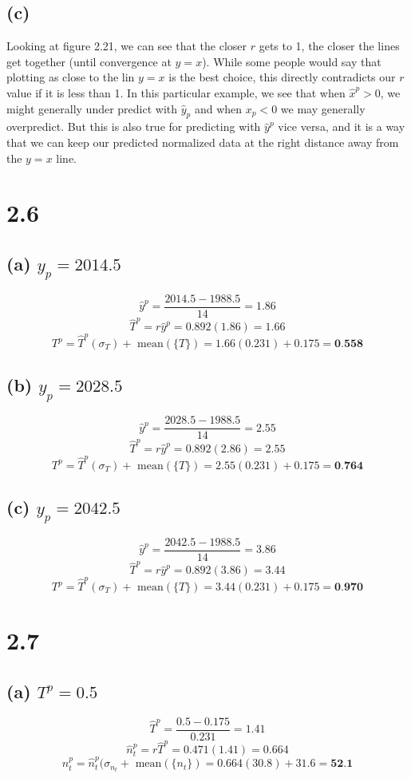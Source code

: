 \documentclass[11pt]{article}
\begin{document}
\subsection*{(c)}
Looking at figure 2.21, we can see that the closer $r$ gets to 1, the closer the lines get together (until convergence at $y=x$). While some people would say that plotting as close to the lin $y=x$ is the best choice, this directly contradicts our $r$ value if it is less than 1. In this particular example, we see that when $\hat{x}^p>0$, we might generally under predict with $\hat{y}_p$ and when $x_p<0$ we may generally overpredict. But this is also true for predicting with $\hat{y}^p$ vice versa, and it is a way that we can keep our predicted normalized data at the right distance away from the $y=x$ line.
\clearpage
\section*{2.6}
\subsection*{(a) $y_p=2014.5$}
\[\hat{y}^p=\frac{2014.5-1988.5}{14}=1.86\]
\[\hat{T}^p=r\hat{y}^p=0.892(1.86)=1.66\]
\[T^p=\hat{T}^p(\sigma_T)+\text{ mean}(\{T\})=1.66(0.231)+0.175=\textbf{0.558}\]
\subsection*{(b) $y_p=2028.5$}
\[\hat{y}^p=\frac{2028.5-1988.5}{14}=2.55\]
\[\hat{T}^p=r\hat{y}^p=0.892(2.86)=2.55\]
\[T^p=\hat{T}^p(\sigma_T)+\text{ mean}(\{T\})=2.55(0.231)+0.175=\textbf{0.764}\]
\subsection*{(c) $y_p=2042.5$}
\[\hat{y}^p=\frac{2042.5-1988.5}{14}=3.86\]
\[\hat{T}^p=r\hat{y}^p=0.892(3.86)=3.44\]
\[T^p=\hat{T}^p(\sigma_T)+\text{ mean}(\{T\})=3.44(0.231)+0.175=\textbf{0.970}\]
\clearpage
\section*{2.7}
\subsection*{(a) $T^p=0.5$}
\[\hat{T}^p=\frac{0.5-0.175}{0.231}=1.41\]
\[\hat{n}_t^p=r\hat{T}^p=0.471(1.41)=0.664\]
\[n_t^p=\hat{n}_t^p(\sigma_{n_t}+\text{ mean}(\{n_t\})=0.664(30.8)+31.6=\textbf{52.1}\]
\end{document}
